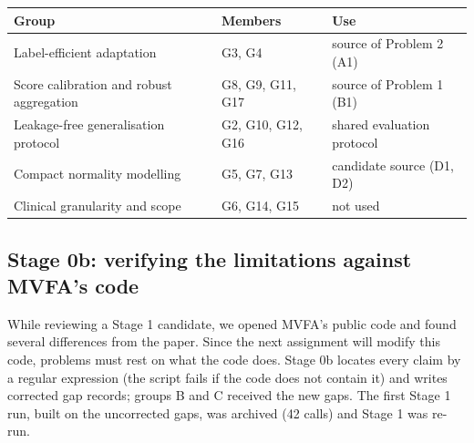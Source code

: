 \documentclass[11pt,a4paper]{article}
\begin{document}
\begin{tabularx}{\linewidth}{@{}l Y l@{}}\toprule Group & Members & Use\\\midrule
Label-efficient adaptation & G3, G4 & source of Problem 2 (A1)\\
Score calibration and robust aggregation & G8, G9, G11, G17 & source of Problem 1 (B1)\\
Leakage-free generalisation protocol & G2, G10, G12, G16 & shared evaluation protocol\\
Compact normality modelling & G5, G7, G13 & candidate source (D1, D2)\\
Clinical granularity and scope & G6, G14, G15 & not used\\
\bottomrule\end{tabularx}
\subsection{Stage 0b: verifying the limitations against MVFA's code}
While reviewing a Stage 1 candidate, we opened MVFA's public code and found several differences from the paper. Since the next assignment will modify this code, problems must rest on what the code does. Stage 0b locates every claim by a regular expression (the script fails if the code does not contain it) and writes corrected gap records; groups B and C received the new gaps. The first Stage 1 run, built on the uncorrected gaps, was archived (42 calls) and Stage 1 was re-run.
\end{document}
